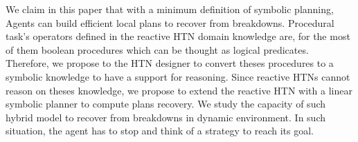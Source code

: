 \documentclass[conference]{IEEEtran}
\begin{document}
	\par We claim in this paper that with a minimum definition of symbolic planning, Agents can build efficient local plans to recover from breakdowns. Procedural task's operators defined in the reactive HTN domain knowledge are, for the most of them boolean procedures which can be thought as logical predicates. Therefore, we propose to the HTN designer to convert theses procedures to a symbolic knowledge to have a support for reasoning. Since reactive HTNs cannot reason on theses knowledge, we propose to extend the reactive HTN  with a linear symbolic planner  to compute plans recovery.  We study the capacity of such hybrid model to recover from breakdowns in dynamic environment. 	In such situation, the agent has to stop and think of a strategy to reach its goal.
%		
%	
	
\end{document}
